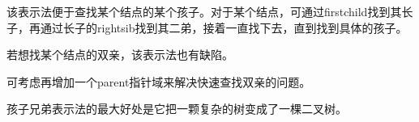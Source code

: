 %
\begin{frame}

\end{frame}
%
%
\begin{frame}
\begin{figure}
\centering

\end{figure}
\end{frame}
%
\begin{frame}
该表示法便于查找某个结点的某个孩子。对于某个结点，可通过firstchild找到其长子，再通过长子的rightsib找到其二弟，接着一直找下去，直到找到具体的孩子。 \pause \vspace{0.1in}

若想找某个结点的双亲，该表示法也有缺陷。\vspace{0.05in}

可考虑再增加一个parent指针域来解决快速查找双亲的问题。

\end{frame}

\begin{frame}
孩子兄弟表示法的最大好处是它把一颗复杂的树变成了一棵二叉树。
\end{frame}

\begin{frame}
\begin{figure}
\centering

\end{figure}
\end{frame}
